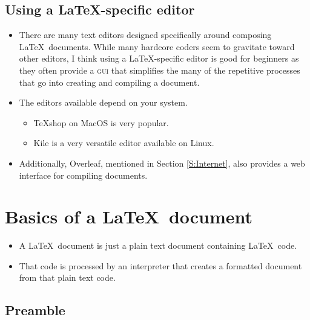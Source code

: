 \documentclass[11pt, letterpaper]{article}
\begin{document}
  \subsection{Using a \LaTeX-specific editor}
  
    \begin{itemize}
      \item There are many text editors designed specifically around composing \LaTeX\ documents. While many hardcore coders seem to gravitate toward other editors, I think using a \LaTeX-specific editor is good for beginners as they  often provide a \textsc{gui} that simplifies the many of the repetitive processes that go into creating and compiling a document.
      
      \item The editors available depend on your system.
      
	  \begin{itemize}
	  
	    \item TeXshop on MacOS is very popular.
	    
	    \item Kile is a very versatile editor available on Linux.
	  
	  \end{itemize}
      
      \item Additionally, Overleaf, mentioned in Section \ref{S:Internet}, also provides a web interface for compiling documents.
    \end{itemize}

      
  \section{Basics of a \LaTeX\ document}
  
    \begin{itemize}
      \item A \LaTeX\ document is just a plain text document containing \LaTeX\ code.
      
      \item That code is processed by an interpreter that creates a formatted document from that plain text code.
    \end{itemize}

  
  \subsection{Preamble}
  
\end{document}

